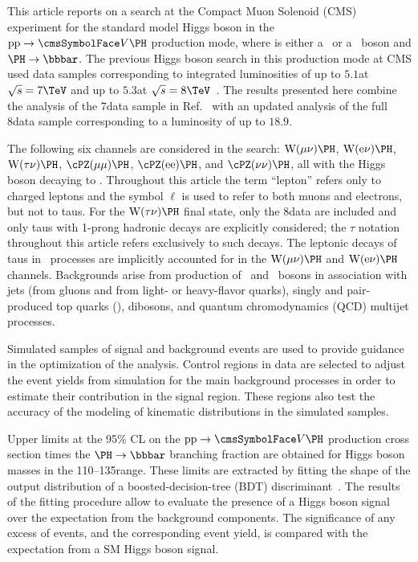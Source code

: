 \documentclass[12pt,twoside,a4paper,cmspaper,final,collab]{cms-tdr}
\begin{document}
This article reports on a search at the Compact Muon Solenoid (CMS) experiment for the standard model Higgs
boson in the $\Pp\Pp\to \VH$ production mode, where \Vvar is either a \PW\ or a \cPZ\ boson and $\PH\to \bbbar$.   The previous Higgs boson search in
this production mode at CMS used
data samples corresponding to integrated
luminosities of up to $5.1$\fbinv at $\sqrt{s}=7\TeV$ and
up to $5.3$\fbinv at $\sqrt{s}=8\TeV$~\cite{Chatrchyan:2013lba}.
The results presented here combine the analysis of the 7\TeV data
sample in Ref.~\cite{Chatrchyan:2013lba}
with an updated analysis of the full 8\TeV data sample corresponding to a luminosity of up to $18.9$\fbinv.


The following six channels are
considered in the search: $\PW(\mu\nu)\PH$,
   $\PW(\Pe\nu)\PH$,
$\PW(\tau\nu)\PH$, $\cPZ(\mu\mu)\PH$, $\cPZ(\Pe\Pe)\PH$, and
   $\cPZ(\nu\nu)\PH$, all
with the Higgs boson decaying to \bbbar. Throughout this article the term ``lepton''
refers only to charged leptons and the symbol
$\ell$ is used to refer to both muons and electrons, but not
to taus. For the
$\PW(\tau\nu)\PH$ final state, only the 8\TeV data are
included and only taus with 1-prong
hadronic decays are explicitly considered; the $\tau$ notation
throughout this article refers exclusively to such decays. The leptonic
decays of taus in \WH\ processes are implicitly accounted for in the
$\PW(\mu\nu)\PH$ and $\PW(\Pe\nu)\PH$
channels.
Backgrounds arise from production of \PW\ and \cPZ\  bosons in association with
jets (from gluons and from light- or heavy-flavor quarks), singly and pair-produced top quarks (\ttbar), dibosons, and
quantum chromodynamics (QCD) multijet processes.


Simulated samples of signal and background events are used to provide
guidance in the optimization of the analysis. Control regions in data
are selected to adjust the event yields from simulation for the main
background processes in order to estimate their contribution in the signal
region. These regions also test the accuracy of the modeling of kinematic
distributions in the simulated samples.


Upper limits at the 95\% CL on the
$\Pp\Pp\to \VH$ production cross section times the $\PH\to
\bbbar$ branching fraction are
obtained for Higgs boson masses in the
110--135\GeV range. These limits are extracted by fitting the shape
of the output distribution of a boosted-decision-tree (BDT)
discriminant~\cite{Roe:2004na,Hocker:2007ht}. The results of the fitting procedure
allow to evaluate the presence of a Higgs boson signal over the
expectation from the background components. The
significance of any excess of events, and the corresponding event yield, is compared
with the expectation from a SM Higgs boson signal.
\end{document}

